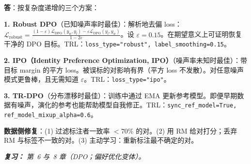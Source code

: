 \begin{questionbox}
\textbf{答}：按复杂度递增的三个方案：

\textbf{1. Robust DPO}（已知噪声率时最佳）：解析地去偏 loss：$\mathcal{L}_\text{robust} = \frac{(1-\varepsilon)\mathcal{L}_\text{DPO}(y_w, y_l) - \varepsilon \mathcal{L}_\text{DPO}(y_l, y_w)}{1 - 2\varepsilon}$。设 $\varepsilon = 0.15$。在期望意义上可证明恢复干净的 DPO 目标。TRL：\texttt{loss\_type="robust", label\_smoothing=0.15}。

\textbf{2. IPO（Identity Preference Optimization, IPO）}（噪声率未知时最佳）：带目标 margin 的平方 loss。被误标的对影响有界（平方 loss 不发散）。对任意噪声模式更鲁棒，且无需知道 $\varepsilon$。TRL：\texttt{loss\_type="ipo"}。

\textbf{3. TR-DPO}（分布漂移时最佳）：训练中通过 EMA 更新参考模型。即便早期数据有噪声，演化的参考也能帮助模型自我修正。TRL：\texttt{sync\_ref\_model=True, ref\_model\_mixup\_alpha=0.6}。

\textbf{数据侧修复}：(1) 过滤标注者一致率 $<$70\% 的对。(2) 用 RM 给对打分；丢弃 RM 与标签不一致的对。(3) 主动学习：重新标注最不确定的对。

\emph{\textbf{复习：} 第~6 与~8 章（DPO；偏好优化变体）。}
\end{questionbox}

